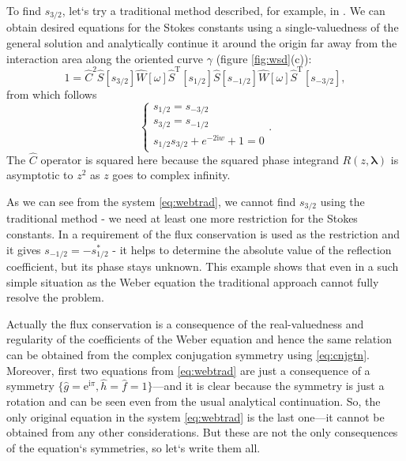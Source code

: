 \documentclass[atmp]{ipart_v1}
\def\rme{\mathrm{e}}
\def\rmi{\mathrm{i}}
\def\lmbd{\bm{\lambda}}
\def\f{\hat{f}}
\def\g{\hat{g}}
\def\h{\hat{h}}
\def\S{\widehat{S}}
\def\W{\widehat{W}}
\def\C{\widehat{C}}
\def\T{\mathrm{T}}
\def\unity{1}
\def\w{\omega}
\newcommand\eref[1]{\eqref{#1}}
\newcommand\fref[1]{figure \ref{#1}}
\begin{document}
To find $s_{3/2}$, let`s try a traditional method described, for example, in \cite{frpaper, rwbook}. 
We can obtain desired equations for the Stokes constants using a single-valuedness of the general 
solution and analytically continue it around the origin far away from the interaction area along the
oriented curve $\gamma$ (\fref{fig:wsd}(c)):
\begin{equation}
\unity = 
\C^2
\S \left[ s_{3/2} \right]
\W \left[ \w \right] 
\S^{\T} \left[ s_{1/2} \right]
\S \left[ s_{-1/2} \right]
\W \left[ \w \right]
\S^{\T} \left[ s_{-3/2} \right],
\end{equation}
from which follows
\begin{equation}
\begin{cases}
s_{1/2} = s_{-3/2}\\
s_{3/2} = s_{-1/2}\\ 
s_{1/2}s_{3/2} + e^{-2 \rmi w} + 1 = 0
\label{eq:webtrad}
\end{cases}.
\end{equation}
The $\C$ operator is squared here because the squared phase integrand $R(z,\lmbd)$ 
is asymptotic to $z^2$ as $z$ goes to complex infinity.

As we can see from the system \eref{eq:webtrad}, we cannot find $s_{3/2}$ using the traditional method - 
we need at least one more restriction for the Stokes constants. In \cite{rwbook} a 
requirement of the flux conservation is used as the restriction 
and it gives $s_{-1/2}=-s_{1/2}^*$ - it helps to determine the absolute value of the
reflection coefficient, but its phase stays unknown. This example shows that even in 
a such simple situation as the Weber equation the traditional approach cannot fully 
resolve the problem.
 
Actually the flux conservation is a consequence of the real-valuedness and regularity of the coefficients 
of the Weber equation and hence the same relation can be obtained from the 
complex conjugation symmetry using \eref{eq:cnjgtn}. Moreover, first two equations from \eref{eq:webtrad} 
are just a consequence of a symmetry $\{\g=\rme^{\rmi\pi},\h=\f=\unity\}$---and it is clear 
because the symmetry is just a rotation and can be seen even from the usual analytical continuation. 
So, the only original equation in the system \eref{eq:webtrad} is the last one---it cannot 
be obtained from any other considerations. But these are not the only consequences of the 
equation`s symmetries, so let`s write them all.
\end{document}
